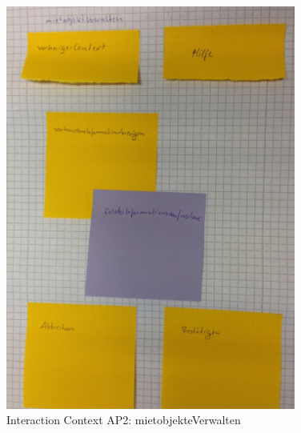 \begin{figure}[H]
\centering
\includegraphics[angle=90, width=0.85\textwidth] {./images/abstract/version2/mietobjekteVerwalten.JPG}
\caption{Interaction Context AP2: mietobjekteVerwalten}
\label{interfaceContents48}
\end{figure}

